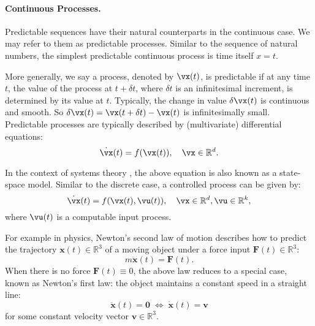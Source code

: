 \documentclass[\toplevelprefix/book-main.tex]{subfiles}
\begin{document}
\paragraph{Continuous Processes.}
Predictable sequences have their natural counterparts in the continuous case. We may refer to them as predictable processes. Similar to the sequence of natural numbers, the simplest predictable continuous process is time itself $x=t$.

More generally, we say a process, denoted by $\vx(t)$, is predictable if at any time $t$, the value of the process at $t+\delta t$, where $\delta t$ is an infinitesimal increment, is determined by its value at $t$. Typically, the change in value $\delta \vx(t)$ is continuous and smooth. So $\delta \vx(t) = \vx(t + \delta t) - \vx(t)$ is infinitesimally small.  Predictable processes are typically described by (multivariate) differential equations:
\begin{equation}
    \dot{\vx}(t) = f(\vx(t)), \quad \vx \in \mathbb{R}^d. 
    \label{eqn:process}
\end{equation}

In the context of systems theory \cite{Cal:Des,Sastry-Nonlinear}, the above equation is also known as a state-space model. Similar to the discrete case, a controlled process can be given by:
\begin{equation}
    \dot{\vx}(t) = f(\vx(t), \vu(t) ), \quad \vx \in \mathbb{R}^d, \vu \in \mathbb{R}^k,
    \label{eqn:process-controlled}
\end{equation}
where $\vu(t)$ is a computable input process. 

\begin{example}
    For example in physics, Newton's second law of motion describes how to predict the trajectory $\boldsymbol{x}(t) \in \mathbb{R}^3$ of a moving object under a force input $\boldsymbol{F}(t) \in \mathbb{R}^3$:
\begin{equation}
    m\ddot{\boldsymbol{x}}(t) = \boldsymbol{F}(t).
\end{equation}
When there is no force $\boldsymbol{F}(t) \equiv 0$, the above law reduces to a  special case, known as Newton's first law: the object maintains a constant speed in a straight line:
\begin{equation}
   \ddot{\boldsymbol{x}}(t) = \boldsymbol{0} \; \Leftrightarrow \; \dot{\boldsymbol{x}}(t) = \boldsymbol{v}
\end{equation}
for some constant velocity vector $\boldsymbol{v} \in \mathbb{R}^3$.
\end{example}
\end{document}
